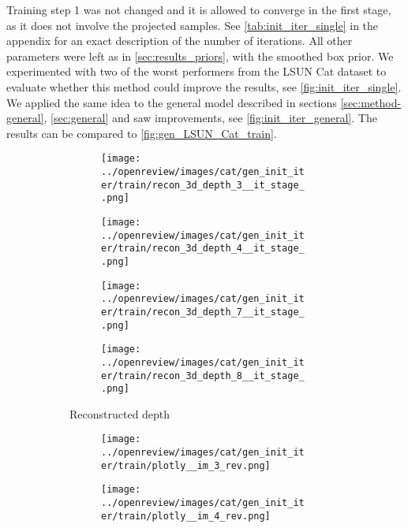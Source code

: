 Training step 1 was not changed and it is allowed to converge in the first stage, as it does not involve the projected samples. See \autoref{tab:init_iter_single} in the appendix for an exact description of the number of iterations. All other parameters were left as in \autoref{sec:results_priors}, with the smoothed box prior. We experimented with two of the worst performers from the LSUN Cat dataset to evaluate whether this method could improve the results, see \autoref{fig:init_iter_single}. We applied the same idea to the general model described in sections \ref{sec:method-general}, \ref{sec:general} and saw improvements, see \autoref{fig:init_iter_general}. The results can be compared to \autoref{fig:gen_LSUN_Cat_train}.
\begin{figure}[!htb]
\begin{subfigure}{\textwidth}
    \begin{subfigure}{0.24\textwidth}
    \centering
    \texttt{[image: ../openreview/images/cat/gen\_init\_iter/train/recon\_3d\_depth\_3\_\_it\_stage\_.png]}
\end{subfigure}
\begin{subfigure}{0.24\textwidth}
    \centering
    \texttt{[image: ../openreview/images/cat/gen\_init\_iter/train/recon\_3d\_depth\_4\_\_it\_stage\_.png]}
\end{subfigure}
\begin{subfigure}{0.24\textwidth}
    \centering
    \texttt{[image: ../openreview/images/cat/gen\_init\_iter/train/recon\_3d\_depth\_7\_\_it\_stage\_.png]}
\end{subfigure}
\begin{subfigure}{0.24\textwidth}
    \centering
    \texttt{[image: ../openreview/images/cat/gen\_init\_iter/train/recon\_3d\_depth\_8\_\_it\_stage\_.png]}
\end{subfigure}
    \caption{Reconstructed depth}
\end{subfigure}
\begin{subfigure}{\textwidth}
    \begin{subfigure}{0.24\textwidth}
    \centering
    \texttt{[image: ../openreview/images/cat/gen\_init\_iter/train/plotly\_\_im\_3\_rev.png]}
\end{subfigure}
\begin{subfigure}{0.24\textwidth}
    \centering
    \texttt{[image: ../openreview/images/cat/gen\_init\_iter/train/plotly\_\_im\_4\_rev.png]}
\end{subfigure}
\begin{subfigure}{0.24\textwidth}

\end{subfigure}
\end{subfigure}
\end{figure}
